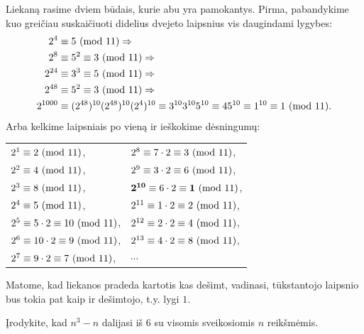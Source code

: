 \begin{sprendimas}
Liekaną rasime dviem būdais, kurie abu yra pamokantys. Pirma, pabandykime
kuo greičiau suskaičiuoti didelius dvejeto laipsnius vis daugindami
lygybes: 
\begin{align*} 2^{4} &\equiv  5 \ (\text{mod } 11)  \Rightarrow
  \\ 2^{8} &\equiv  5^2 \equiv 3 \ (\text{mod } 11)  \Rightarrow  \\ 2^{24}&\equiv  3^3
  \equiv 5 \ (\text{mod } 11)  \Rightarrow  \\ 2^{48}&\equiv  5^2 \equiv 3  \ (\text{mod } 11)
  \Rightarrow  \\ 2^{1000}&\equiv  (2^{48})^{10} (2^{48})^{10} (2^4)^{10}
  \equiv 3^{10} 3^{10} 5^{10} \equiv 45^{10} \equiv 1^{10} \equiv 1 \ (\text{mod } 11).
\end{align*} 
Arba kelkime laipsniais po vieną ir ieškokime dėsningumų: 

\begin{center} 
  \begin{tabular}{ l l } $2^{1} \equiv  2 \ (\text{mod } 11)$, &   $2^{8}
  \equiv  7\cdot 2 \equiv 3 \ (\text{mod } 11)$,    \\ $2^{2} \equiv  4 \ (\text{mod } 11)$, &
  $2^{9} \equiv  3\cdot 2 \equiv 6 \ (\text{mod } 11)$,    \\ $2^{3} \equiv  8 \ (\text{mod } 11)$, &
  $\mathbf{2^{10}} \equiv  6\cdot 2 \equiv \mathbf{1} \ (\text{mod } 11)$,    \\ $2^{4}
  \equiv  5 \ (\text{mod } 11)$, &   $2^{11} \equiv  1\cdot 2 \equiv 2 \ (\text{mod } 11)$,    \\
  $2^{5} \equiv  5\cdot 2 \equiv 10 \ (\text{mod } 11)$, &   $2^{12} \equiv  2\cdot 2
  \equiv 4 \ (\text{mod } 11)$,    \\ $2^{6} \equiv  10\cdot 2 \equiv 9 \ (\text{mod } 11)$, &
  $2^{13} \equiv  4\cdot 2 \equiv 8 \ (\text{mod } 11)$,    \\ $2^{7} \equiv  9\cdot 2
  \equiv 7 \ (\text{mod } 11) $, &   \hspace{2cm}$\cdots$ 
\end{tabular} 
\end{center}

Matome, kad liekanos pradeda kartotis kas dešimt, vadinasi, tūkstantojo
laipsnio bus tokia pat kaip ir dešimtojo, t.y. lygi $1$.
\end{sprendimas}

\begin{pavnr} Įrodykite, kad $n^3 - n$ dalijasi iš $6$ su visomis
  sveikosiomis $n$ reikšmėmis.  
\end{pavnr}

